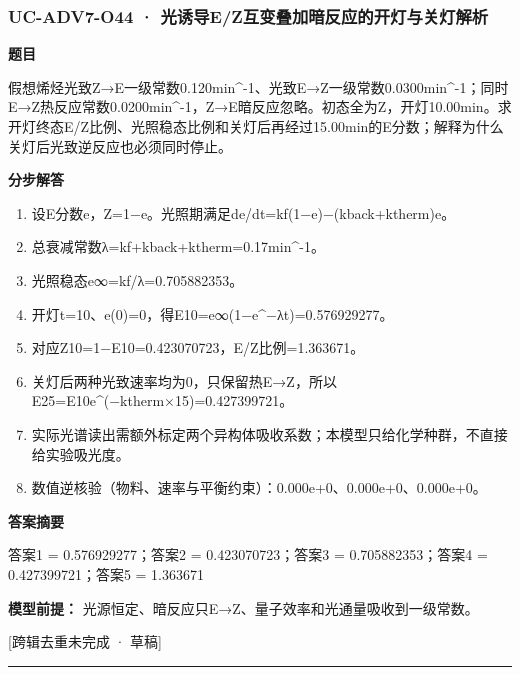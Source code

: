 \documentclass[UTF8,11pt,a4paper]{ctexart}
\begin{document}
\subsubsection*{UC-ADV7-O44 · 光诱导E/Z互变叠加暗反应的开灯与关灯解析}
\noindent\textbf{题目}\par
假想烯烃光致Z→E一级常数0.120min\textasciicircum{}-1、光致E→Z一级常数0.0300min\textasciicircum{}-1；同时E→Z热反应常数0.0200min\textasciicircum{}-1，Z→E暗反应忽略。初态全为Z，开灯10.00min。求开灯终态E/Z比例、光照稳态比例和关灯后再经过15.00min的E分数；解释为什么关灯后光致逆反应也必须同时停止。\par
\medskip\noindent\textbf{分步解答}
\begin{enumerate}
\item 设E分数e，Z=1−e。光照期满足de/dt=kf(1−e)−(kback+ktherm)e。
\item 总衰减常数λ=kf+kback+ktherm=0.17min\textasciicircum{}-1。
\item 光照稳态e∞=kf/λ=0.705882353。
\item 开灯t=10、e(0)=0，得E10=e∞(1−e\textasciicircum{}−λt)=0.576929277。
\item 对应Z10=1−E10=0.423070723，E/Z比例=1.363671。
\item 关灯后两种光致速率均为0，只保留热E→Z，所以E25=E10e\textasciicircum{}(−ktherm×15)=0.427399721。
\item 实际光谱读出需额外标定两个异构体吸收系数；本模型只给化学种群，不直接给实验吸光度。
\item 数值逆核验（物料、速率与平衡约束）：0.000e+0、0.000e+0、0.000e+0。
\end{enumerate}
\noindent\textbf{答案摘要}\par
答案1 = 0.576929277；答案2 = 0.423070723；答案3 = 0.705882353；答案4 = 0.427399721；答案5 = 1.363671\par
\noindent\textbf{模型前提：}
光源恒定、暗反应只E→Z、量子效率和光通量吸收到一级常数。\par
\noindent\textcolor{red!65!black}{[跨辑去重未完成 · 草稿]} \par
\medskip\hrule\medskip
{}
\end{document}
